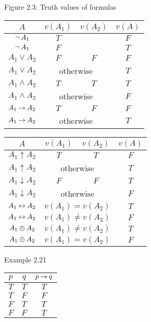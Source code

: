 \documentclass[style=simple,size=12pt]{powerdot}
\begin{document}
\begin{wideslide}[bm=,toc=]{Figure 2.3: Truth values of formulas}
\noindent
\begin{minipage}{0.42\textwidth}
\begin{tabular}{|c|c|c|c|}
\hline
$A$ & $v(A_{1})$ & $v(A_{2})$ & $v(A)$ \\ \hline \hline
$\mathop{\neg} A_{1}$ & $T$ & & $F$  \\
$\mathop{\neg} A_{1}$ & $F$ & & $T$ \\ \hline
$A_{1} \vee A_{2}$ & $F$ & $F$ & $F$ \\
$A_{1} \vee A_{2}$ & \multicolumn{2}{c|}{otherwise}  & $T$ \\ \hline
$A_{1} \wedge A_{2}$ & $T$ & $T$ & $T$ \\
$A_{1} \wedge A_{2}$ & \multicolumn{2}{c|}{otherwise}  & $F$ \\ \hline
$A_{1} \mathbin{\rightarrow} A_{2}$ & $T$ & $F$ & $F$ \\
$A_{1} \mathbin{\rightarrow}  A_{2}$ &
   \multicolumn{2}{c|}{otherwise}  & $T$ \\ \hline
\end{tabular}
\end{minipage}
\hspace{0.08\textwidth}
\begin{minipage}{0.42\textwidth}
\begin{tabular}{|c|c|c|c|}
\hline
$A$ & $v(A_{1})$ & $v(A_{2})$ & $v(A)$ \\ \hline \hline
$A_{1} \uparrow A_{2}$ & $T$ & $T$ & $F$ \\
$A_{1} \uparrow  A_{2}$ &
   \multicolumn{2}{c|}{otherwise}  & $T$ \\ \hline
$A_{1} \downarrow A_{2}$ & $F$ & $F$ & $T$ \\
$A_{1} \downarrow  A_{2}$ &
   \multicolumn{2}{c|}{otherwise}  & $F$ \\ \hline
$A_{1} \mathbin{\leftrightarrow} A_{2}$ & \multicolumn{2}{c|}{$v(A_{1})=v(A_{2})$} & $T$ \\
$A_{1} \mathbin{\leftrightarrow} A_{2}$ & \multicolumn{2}{c|}{$v(A_{1})\neq v(A_{2})$} &
  $F$ \\ \hline
$A_{1} \mathbin{\oplus} A_{2}$ & \multicolumn{2}{c|}{$v(A_{1})\neq v(A_{2})$} & $T$ \\
$A_{1} \mathbin{\oplus} A_{2}$ & \multicolumn{2}{c|}{$v(A_{1})=v(A_{2})$} &
  $F$ \\ \hline
\end{tabular}
\end{minipage}
\end{wideslide}

\begin{wideslide}{Example 2.21}
\begin{center}
\begin{tabular}{|c|c||c|}
\hline
$p$ & $q$ & $p \mathbin{\rightarrow} q$ \\ \hline \hline
$T$ & $T$ & $T$  \\ \hline
$T$ & $F$ & $F$  \\ \hline
$F$ & $T$ & $T$  \\ \hline
$F$ & $F$ & $T$  \\ \hline
\end{tabular}
\end{center}
\end{wideslide}
\end{document}
